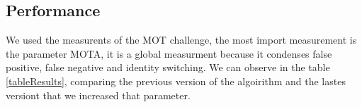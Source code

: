 \documentclass[12pt, a4paper, titlepage,twoside,openright]{article}
\begin{document}
\subsection{Performance}

We used the measurents of the MOT challenge, the most import measurement is the parameter MOTA,  it is a global measurment because it condenses false positive, false negative and identity switching. We can observe in the table \ref{tableResults}, comparing the previous version of the algoirithm and the lastes versiont that we increased that parameter. 

\begin{table}[H]
\centering

\caption{Results algorithm.}
\label{tableResults}
\end{table}
\end{document}
